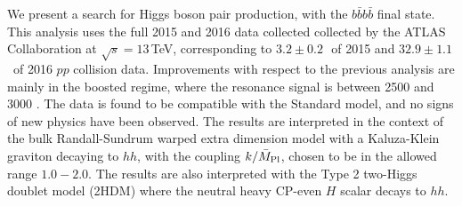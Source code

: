 We present a search for Higgs boson pair production, with the $b\bar{b}b\bar{b}$ final state. This analysis uses the full 2015 and 2016 data collected collected by the ATLAS Collaboration at $\sqrt{s}=13$\,TeV, corresponding to $3.2 \pm 0.2$\,\ifb\ of 2015 and $32.9 \pm 1.1$\, \ifb\ of 2016 $pp$ collision data. 
Improvements with respect to the previous analysis are mainly in the boosted regime, where the resonance signal is between 2500 \GeV and 3000 \GeV. 
The data is found to be compatible with the Standard model, and no signs of new physics have been observed.
The results are interpreted in the context of the bulk Randall-Sundrum warped extra dimension model with a Kaluza-Klein graviton decaying to $hh$, with the coupling $k/\bar{M}_{\rm Pl}$, chosen to be in the allowed range $1.0 - 2.0$.
The results are also interpreted with the Type 2 two-Higgs doublet model (2HDM) where the neutral heavy CP-even $H$ scalar decays to $hh$.  